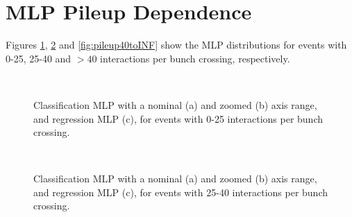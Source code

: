 \documentclass[NOTE, atlasdraft=true, texlive=2017, UKenglish]{\ATLASLATEXPATH atlasdoc}
\begin{document}


\clearpage
\section{MLP Pileup Dependence}
\label{app:mlppileup}

Figures \ref{fig:pileup0to25}, \ref{fig:pileup25to40} and \ref{fig:pileup40toINF} show the MLP distributions for events with 0-25, 25-40 and $>40$ interactions per bunch crossing, respectively.

\begin{figure}[!htbp]
  \centering
  \\
  \caption{Classification MLP with a nominal (a) and zoomed (b) axis range, and regression MLP (c), for events with 0-25 interactions per bunch crossing.}
  \label{fig:pileup0to25}
\end{figure}

\begin{figure}[!htbp]
  \centering
  \\
  \caption{Classification MLP with a nominal (a) and zoomed (b) axis range, and regression MLP (c), for events with 25-40 interactions per bunch crossing.}
  \label{fig:pileup25to40}
\end{figure}
\end{document}
